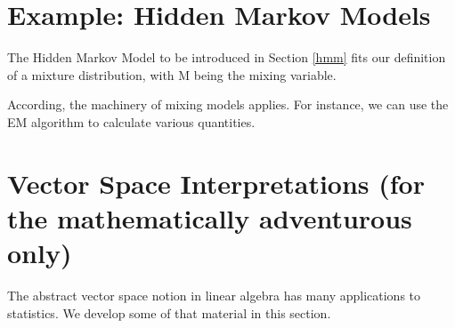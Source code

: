 \documentclass[11pt]{article}
\begin{document}
\section{Example:  Hidden Markov Models}

The Hidden Markov Model to be introduced in Section \ref{hmm} fits our
definition of a mixture distribution, with M being the mixing variable.

According, the machinery of mixing models applies.  For instance, we can
use the EM algorithm to calculate various quantities.

% 
% 
% 
% 
% 

% 
% 


\section{Vector Space Interpretations (for the mathematically
adventurous only)}
\label{adventure}

The abstract vector space notion in linear algebra has many applications
to statistics.  We develop some of that material in this section.

\end{document}
